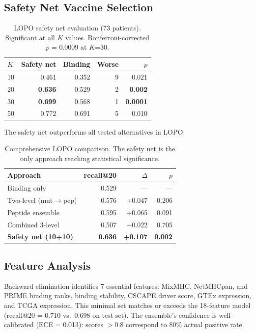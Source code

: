 \documentclass[11pt,twocolumn]{article}
\begin{document}
\subsection{Safety Net Vaccine Selection}

\begin{table}[ht]
\centering
\footnotesize
\begin{tabular}{@{}lrrrr@{}}
\toprule
$K$ & Safety net & Binding & Worse & $p$ \\
\midrule
10 & 0.461 & 0.352 & 9 & 0.021 \\
20 & \textbf{0.636} & 0.529 & 2 & \textbf{0.002} \\
30 & \textbf{0.699} & 0.568 & 1 & \textbf{0.0001} \\
50 & 0.772 & 0.691 & 5 & 0.010 \\
\bottomrule
\end{tabular}
\caption{LOPO safety net evaluation (73 patients). Significant at all $K$ values. Bonferroni-corrected $p$ = 0.0009 at $K$=30.}
\end{table}

The safety net outperforms all tested alternatives in LOPO:

\begin{table}[ht]
\centering
\footnotesize
\begin{tabular}{@{}lrrr@{}}
\toprule
Approach & recall@20 & $\Delta$ & $p$ \\
\midrule
Binding only & 0.529 & --- & --- \\
Two-level (mut$\to$pep) & 0.576 & +0.047 & 0.206 \\
Peptide ensemble & 0.595 & +0.065 & 0.091 \\
Combined 3-level & 0.507 & $-$0.022 & 0.705 \\
\textbf{Safety net (10+10)} & \textbf{0.636} & \textbf{+0.107} & \textbf{0.002} \\
\bottomrule
\end{tabular}
\caption{Comprehensive LOPO comparison. The safety net is the only approach reaching statistical significance.}
\end{table}

\subsection{Feature Analysis}

Backward elimination identifies 7 essential features: MixMHC, NetMHCpan, and PRIME binding ranks, binding stability, CSCAPE driver score, GTEx expression, and TCGA expression. This minimal set matches or exceeds the 18-feature model (recall@20 = 0.710 vs.\ 0.698 on test set). The ensemble's confidence is well-calibrated (ECE = 0.013): scores $>$0.8 correspond to 80\% actual positive rate.
\end{document}

